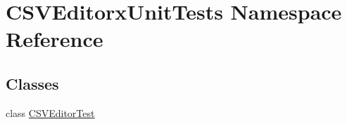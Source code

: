 \hypertarget{namespace_c_s_v_editorx_unit_tests}{}\section{C\+S\+V\+Editorx\+Unit\+Tests Namespace Reference}
\label{namespace_c_s_v_editorx_unit_tests}
\subsection*{Classes}
\begin{DoxyCompactItemize}
\item 
class \mbox{\hyperlink{class_c_s_v_editorx_unit_tests_1_1_c_s_v_editor_test}{C\+S\+V\+Editor\+Test}}
\end{DoxyCompactItemize}
